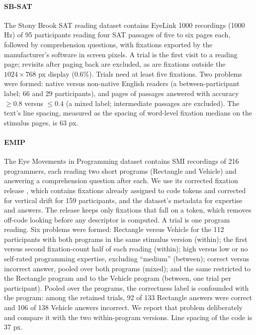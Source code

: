 \documentclass[man,floatsintext,12pt]{apa7}
\begin{document}
\paragraph{SB-SAT} The Stony Brook SAT reading dataset \citep{ahn2020towards} contains EyeLink 1000 recordings (1000 Hz) of 95 participants reading four SAT passages of five to six pages each, followed by comprehension questions, with fixations exported by the manufacturer's software in screen pixels. A trial is the first visit to a reading page; revisits after paging back are excluded, as are fixations outside the $1024\times768$ px display (0.6\%). Trials need at least five fixations. Two problems were formed: native versus non-native English readers (a between-participant label; 66 and 29 participants), and pages of passages answered with accuracy $\geq 0.8$ versus $\leq 0.4$ (a mixed label; intermediate passages are excluded). The text's line spacing, measured as the spacing of word-level fixation medians on the stimulus pages, is 63 px.

\paragraph{EMIP} The Eye Movements in Programming dataset \citep{bednarik2020emip} contains SMI recordings of 216 programmers, each reading two short programs (Rectangle and Vehicle) and answering a comprehension question after each. We use its corrected fixation release \citep{almadi2021emiptoolkit}, which contains fixations already assigned to code tokens and corrected for vertical drift for 159 participants, and the dataset's metadata for expertise and answers. The release keeps only fixations that fall on a token, which removes off-code looking before any descriptor is computed. A trial is one program reading. Six problems were formed: Rectangle versus Vehicle for the 112 participants with both programs in the same stimulus version (within); the first versus second fixation-count half of each reading (within); high versus low or no self-rated programming expertise, excluding ``medium'' (between); correct versus incorrect answer, pooled over both programs (mixed); and the same restricted to the Rectangle program and to the Vehicle program (between, one trial per participant). Pooled over the programs, the correctness label is confounded with the program: among the retained trials, 92 of 133 Rectangle answers were correct and 106 of 138 Vehicle answers incorrect. We report that problem deliberately and compare it with the two within-program versions. Line spacing of the code is 37 px.
\end{document}
